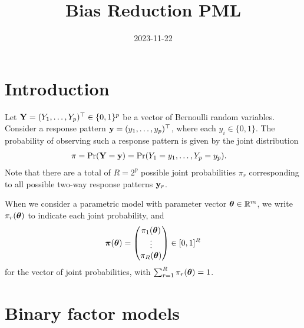 \documentclass[
]{article}
\title{Bias Reduction PML}
\author{}
\date{\vspace{-2.5em}2023-11-22}
\begin{document}
\maketitle

\newcommand{\pimod}[1]{\pi_{#1}(\btheta)}
\newcommand{\Sigmaystar}{\bSigma_{\by^*}}
\newcommand{\pl}{\operatorname{\ell_P}}
\newcommand{\mlepl}{\hat\btheta_{\text{PL}}}
\newcommand{\mle}{\hat\btheta_{\text{ML}}}
\newcommand{\pimodpl}{\pi_{y_iy_j}^{(ij)}(\btheta)}
\newcommand{\tr}{\operatorname{tr}}

\section{Introduction}\label{introduction}

Let \({\mathbf Y} = (Y_1, \dots, Y_p)^\top \in \{0,1\}^p\) be a vector of
Bernoulli random variables. Consider a response pattern
\({\mathbf y} = (y_1,\dots,y_p)^\top\), where each \(y_i\in\{0,1\}\). The
probability of observing such a response pattern is given by the joint
distribution \begin{align}\label{eq:jointprob1}
\pi
&= \Pr({\mathbf Y} = {\mathbf y})  = \Pr(Y_1=y_1,\dots,Y_p=y_p).
\end{align} Note that there are a total of \(R=2^p\) possible joint
probabilities \(\pi_r\) corresponding to all possible two-way response
patterns \({\mathbf y}_r\).

When we consider a parametric model with parameter vector
\({\boldsymbol\theta}\in\mathbb{R}^m\), we write \(\pi_r({\boldsymbol\theta})\) to indicate each joint
probability, and \begin{equation}\label{eq:jointprob2}
{\boldsymbol\pi}({\boldsymbol\theta}) = \begin{pmatrix}
\pi_{1}({\boldsymbol\theta}) \\
\vdots \\
\pi_{R}({\boldsymbol\theta})  \\
\end{pmatrix} \in [0,1]^R
\end{equation} for the vector of joint probabilities, with
\(\sum_{r=1}^R \pi_{r}({\boldsymbol\theta}) =1\).

\section{Binary factor models}\label{binary-factor-models}
\end{document}
